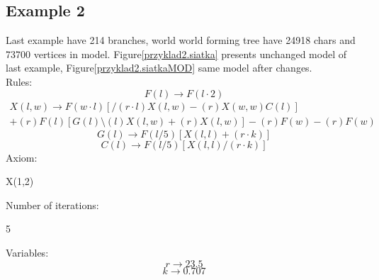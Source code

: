 \documentclass[b5paper,twoside,11pt]{article}
\renewcommand{\figurename}{Figure}
\begin{document}
\subsection*{Example 2}
Last example have 214 branches, world world forming tree have 24918 chars and 73700 vertices in model. 
\figurename \ref{przyklad2.siatka} presents unchanged model of last example, \figurename \ref{przyklad2.siatkaMOD} same model after changes. \\
Rules: \newline
\begin{equation}
F(l)\rightarrow F(l\cdot2) 
\end{equation}
\begin{multline*}
X(l,w) \rightarrow F(w\cdot l)[/(r\cdot l)X(l,w)-(r)X(w,w)C(l)]\\
+(r)F(l)[G(l)\setminus(l)X(l,w)+(r)X(l,w)]-(r)F(w)-(r)F(w)
\end{multline*}
\begin{equation}
G(l) \rightarrow F(l/5)[X(l,l)+(r\cdot k)]
\end{equation}
\begin{equation}
C(l) \rightarrow F(l/5)[X(l,l)/(r\cdot k)]
\end{equation}
Axiom:
\begin{center}
X(1,2)
\end{center}
Number of iterations:
\begin{center}
5
\end{center}
Variables:
\begin{equation}
r\rightarrow 23.5
\end{equation}
\begin{equation}
k\rightarrow 0.707
\end{equation}
\end{document}
